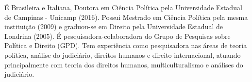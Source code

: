 
\begin{cvparagraph}

 É Brasileira e Italiana, Doutora em Ciência Política pela Universidade Estadual de Campinas - Unicamp (2016). Possui Mestrado em Ciência Política pela mesma instituição (2009) e graduou-se em Direito pela Universidade Estadual de Londrina (2005). É pesquisadora-colaboradora do Grupo de Pesquisas sobre Política e Direito (GPD). Tem experiência como pesquisadora nas áreas de teoria política, análise do judiciário, direitos humanos e direito internacional, atuando principalmente com teoria dos direitos humanos, multiculturalismo e análises do judiciário.

\end{cvparagraph}
